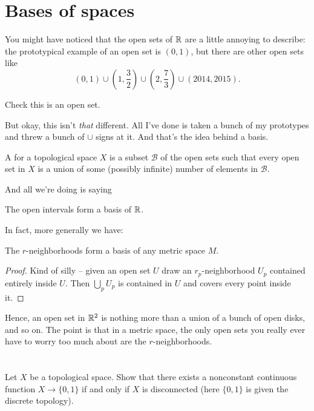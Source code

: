 \section{Bases of spaces}

You might have noticed that the open sets of $\RR$ are a little annoying to describe:
the prototypical example of an open set is $(0,1)$,
but there are other open sets like
\[
	(0,1)
	\cup \left( 1, \frac32 \right)
	\cup \left( 2, \frac 73 \right)
	\cup (2014, 2015). \]
\begin{ques}
	Check this is an open set.
\end{ques}

But okay, this isn't \emph{that} different.
All I've done is taken a bunch of my prototypes and threw a bunch of $\cup$ signs at it.
And that's the idea behind a basis.

\begin{definition}
	A  for a topological space $X$
	is a subset $\mathcal B$ of the open sets
	such that every open set in $X$
	is a union of some (possibly infinite) number of elements in
	$\mathcal B$.
\end{definition}

And all we're doing is saying
\begin{example}[Basis of $\RR$]
	The open intervals form a basis of $\RR$.
\end{example}
In fact, more generally we have:
\begin{theorem}
	The $r$-neighborhoods form a basis of any metric space $M$.
\end{theorem}
\begin{proof}
	Kind of silly -- given an open set $U$
	draw an $r_p$-neighborhood $U_p$ contained entirely inside $U$.
	Then $\bigcup_p U_p$ is contained in $U$ and covers
	every point inside it.
\end{proof}

Hence, an open set in $\mathbb R^2$ is nothing more than a union
of a bunch of open disks, and so on.
The point is that in a metric space, the only open sets you really
ever have to worry too much about are the $r$-neighborhoods.


\section{\problemhead}

\begin{dproblem}
	Let $X$ be a topological space.
	Show that there exists a nonconstant continuous function $X \to \{0,1\}$ if and
	only if $X$ is disconnected (here $\{0,1\}$ is given the discrete topology).
	\label{prob:disconnected_better_def}
\end{dproblem}

